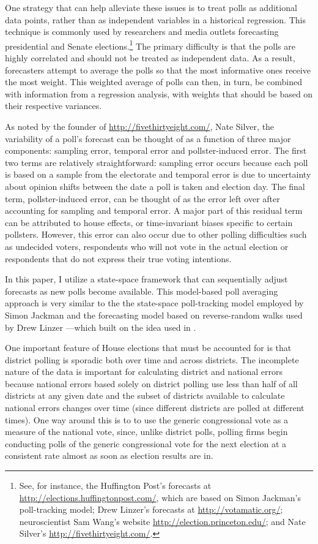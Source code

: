 \documentclass[12pt,final,fleqn]{article}
\theoremstyle{plain}
\begin{document}
One strategy that can help alleviate these issues is to treat polls as additional data points, rather than as independent variables in a historical regression. This technique is commonly used by researchers and media outlets forecasting presidential and Senate elections.\footnote{See, for instance, the Huffington Post's forecasts at \url{http://elections.huffingtonpost.com/}, which are based on Simon Jackman's poll-tracking model; Drew Linzer's forecasts at \url{http://votamatic.org/}; neuroscientist Sam Wang's website \url{http://election.princeton.edu/}; and Nate Silver's \url{http://fivethirtyeight.com/}.} The primary difficulty is that the polls are highly correlated and should not be treated as independent data. As a result, forecasters attempt to average the polls so that the most informative ones receive the most weight. This weighted average of polls can then, in turn, be combined with information from a regression analysis, with weights that should be based on their respective variances.

As noted by the founder of \url{http://fivethirtyeight.com/}, Nate Silver, the variability of a poll's forecast can be thought of as a function of three major components: sampling error, temporal error and pollster-induced error. The first two terms are relatively straightforward: sampling error occurs because each poll is based on a sample from the electorate and temporal error is due to uncertainty about opinion shifts between the date a poll is taken and election day. The final term, pollster-induced error, can be thought of as the error left over after accounting for sampling and temporal error. A major part of this residual term can be attributed to house effects, or time-invariant biases specific to certain pollsters. However, this error can also occur due to other polling difficulties such as undecided voters, respondents who will not vote in the actual election or respondents that do not express their true voting intentions.

In this paper, I utilize a state-space framework that can sequentially adjust forecasts as new polls become available. This model-based poll averaging approach is very similar to the the state-space poll-tracking model employed by Simon Jackman \citep{jackman2005pooling, jackman2009bayesian} and the forecasting model based on reverse-random walks used by Drew Linzer \citep{linzer2013dynamic}---which built on the idea used in \citep{strauss2007florida}. 

One important feature of House elections that must be accounted for is that district polling is sporadic both over time and across districts. The incomplete nature of the data is important for calculating district and national errors because national errors based solely on district polling use less than half of all districts at any given date and the subset of districts available to calculate national errors changes over time (since different districts are polled at different times). One way around this is to to use the generic congressional vote as a measure of the national vote, since, unlike district polls, polling firms begin conducting polls of the generic congressional vote for the next election at a consistent rate almost as soon as election results are in.
\end{document}
